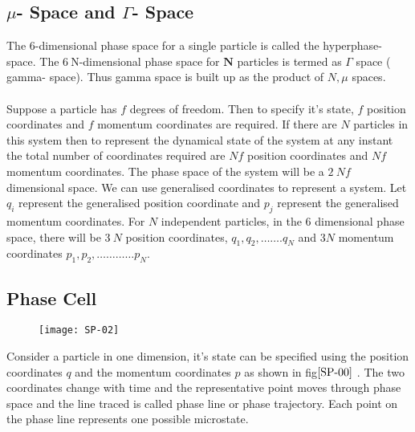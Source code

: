 \subsection{$\mu$- Space and $\Gamma$- Space}
 The 6-dimensional phase space for a single particle is called the hyperphase-space. The $6 \mathrm{~N}$-dimensional phase space for $\mathbf{N}$ particles is termed as $\Gamma$ space ( gamma- space). Thus gamma space is built up as the product of $N, \mu$ spaces.\\\\
 Suppose a particle has $f$ degrees of freedom. Then to specify it's state, $f$ position coordinates and ${f}$ momentum coordinates are required.
If there are $N$ particles in this system then to represent the dynamical state of the system at any instant the total number of coordinates required are $N f$ position coordinates and $N f$ momentum coordinates.  The phase space of the system will be a $2 {~N} f$ dimensional space. We can use generalised coordinates to represent a system. Let $q_{i}$ represent the generalised position coordinate and ${p}_{{j}}$ represent the generalised momentum coordinates. For $N$ independent particles, in the 6 dimensional phase space, there will be $3 {~N}$ position coordinates, $q_{1}, q_{2}, \ldots \ldots . q_{N}$ and $3 N$ momentum coordinates $p_{1}, p_{2}, \ldots \ldots \ldots \ldots p_{N}$.
\subsection{Phase Cell}
\begin{figure}[H]
	\centering
	\texttt{[image: SP-02]}
	\caption{}
	\label{SP-00}
\end{figure}
\par Consider a particle in one dimension, it's state can be specified using the position coordinates $q$ and the momentum coordinates $p$ as shown in fig$\ref{SP-00}$ . The two coordinates change with time and the representative point moves through phase space and the line traced is called phase line or phase trajectory. Each point on the phase line represents one possible microstate.
